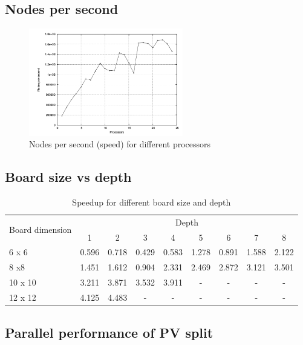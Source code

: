\documentclass[12pt]{article}
\begin{document}
\subsection{Nodes per second}

\begin{figure}[H]
  \centering
  \includegraphics[width=0.6\textwidth, height=0.4\textwidth]{nps.png}
  \caption{Nodes per second (speed) for different processors}
\end{figure}

\subsection{Board size vs depth}

\begin{table}[H]
\centering
\begin{tabular}{|l|c|c|c|c|c|c|c|c|}
\hline
\multirow{2}{*}{Board dimension} & \multicolumn{8}{c|}{Depth}                                    \\ \cline{2-9} 
                                 & 1     & 2     & 3     & 4     & 5     & 6     & 7     & 8     \\ \hline
6 x 6                            & 0.596 & 0.718 & 0.429 & 0.583 & 1.278 & 0.891 & 1.588 & 2.122 \\ \hline
8 x8                             & 1.451 & 1.612 & 0.904 & 2.331 & 2.469 & 2.872 & 3.121 & 3.501 \\ \hline
10 x 10                          & 3.211 & 3.871 & 3.532 & 3.911 & -     & -     & -     & -     \\ \hline
12 x 12                          & 4.125 & 4.483 & -     & -     & -     & -     & -     & -     \\ \hline
\end{tabular}
\caption{Speedup for different board size and depth}
\end{table}

\subsection{Parallel performance of PV split}
\end{document}

